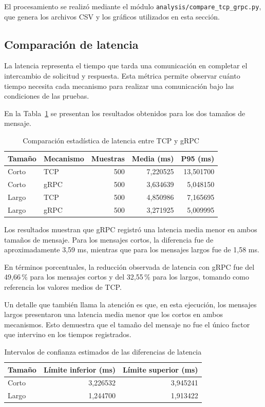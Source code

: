 El procesamiento se realizó mediante el módulo
\texttt{analysis/compare\_tcp\_grpc.py}, que genera los archivos CSV y
los gráficos utilizados en esta sección.

\subsection{Comparación de latencia}

La latencia representa el tiempo que tarda una comunicación en completar
el intercambio de solicitud y respuesta. Esta métrica permite observar
cuánto tiempo necesita cada mecanismo para realizar una comunicación
bajo las condiciones de las pruebas.

En la Tabla~\ref{tab:comparacion-latencia} se presentan los resultados
obtenidos para los dos tamaños de mensaje.

\begin{table}[htbp]
\centering
\caption{Comparación estadística de latencia entre TCP y gRPC}
\label{tab:comparacion-latencia}
\begin{tabular}{llrrr}
\hline
\textbf{Tamaño} & \textbf{Mecanismo} &
\textbf{Muestras} & \textbf{Media (ms)} &
\textbf{P95 (ms)} \\
\hline
Corto & TCP  & 500 & 7,220525 & 13,501700 \\
Corto & gRPC & 500 & 3,634639 & 5,048150 \\
Largo & TCP  & 500 & 4,850986 & 7,165695 \\
Largo & gRPC & 500 & 3,271925 & 5,009995 \\
\hline
\end{tabular}
\end{table}

Los resultados muestran que gRPC registró una latencia media menor en
ambos tamaños de mensaje. Para los mensajes cortos, la diferencia fue
de aproximadamente 3,59 ms, mientras que para los mensajes largos fue
de 1,58 ms.

En términos porcentuales, la reducción observada de latencia con gRPC
fue del 49,66\,\% para los mensajes cortos y del 32,55\,\% para los
largos, tomando como referencia los valores medios de TCP.

Un detalle que también llama la atención es que, en esta ejecución,
los mensajes largos presentaron una latencia media menor que los cortos
en ambos mecanismos. Esto demuestra que el tamaño del mensaje no fue
el único factor que intervino en los tiempos registrados.


\begin{table}[htbp]
\centering
\caption{Intervalos de confianza estimados de las diferencias de latencia}
\label{tab:intervalos-confianza}
\begin{tabular}{lrr}
\hline
\textbf{Tamaño} & \textbf{Límite inferior (ms)} &
\textbf{Límite superior (ms)} \\
\hline
Corto & 3,226532 & 3,945241 \\
Largo & 1,244700 & 1,913422 \\
\hline
\end{tabular}
\end{table}

